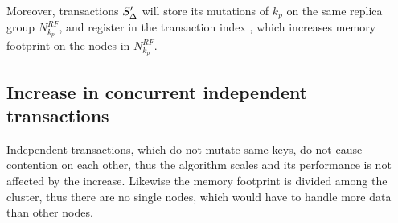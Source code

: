 Moreover, transactions $S'_{\text{$\Delta$}}$ will store its mutations of $k_p$ on the same replica group $N^{RF}_{k_p}$, and register in the transaction index \txIndex, which increases memory footprint on the nodes in $N^{RF}_{k_p}$.

\subsection{Increase in concurrent independent transactions}
Independent transactions, which do not mutate same keys, do not cause contention on each other, thus the algorithm scales and its performance is not affected by the increase. Likewise the memory footprint is divided among the cluster, thus there are no single nodes, which would have to handle more data than other nodes.







